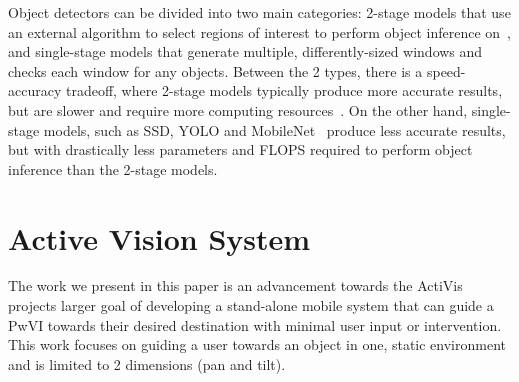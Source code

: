 \documentclass[runningheads]{llncs}
\begin{document}
Object detectors can be divided into two main categories: 2-stage models that use an external algorithm to select regions of interest to perform object inference on~\cite{ren2015faster}, and single-stage models that generate multiple, differently-sized windows and checks each window for any objects.
Between the 2 types, there is a speed-accuracy tradeoff, where 2-stage models typically produce more accurate results, but are slower and require more computing resources~\cite{liu2018deeplf}.
On the other hand, single-stage models, such as SSD, YOLO and MobileNet~\cite{liu2016ssd,redmon2018yolo,howard2017mobilenet} produce less accurate results, but with drastically less parameters and FLOPS required to perform object inference than the 2-stage models. 

\section{Active Vision System}\label{sec:active-vision}

The work we present in this paper is an advancement towards the ActiVis projects larger goal of developing a stand-alone mobile system that can guide a PwVI towards their desired destination with minimal user input or intervention. 
This work focuses on guiding a user towards an object in one, static environment and is limited to 2 dimensions (pan and tilt).
\end{document}
